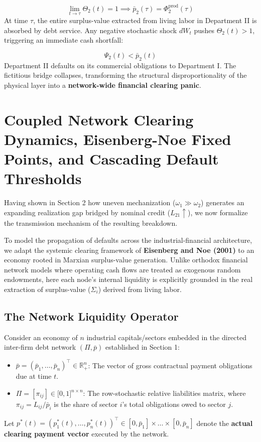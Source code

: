 \documentclass[11pt,letterpaper]{report}
\begin{document}
\[
\lim_{t \to \tau} \Theta_2(t) = 1 \implies \bar{p}_2(\tau) = \Phi_2^{\text{prod}}(\tau)
\]
At time $\tau$, the entire surplus-value extracted from living labor in Department II is absorbed by debt service. Any negative stochastic shock $d{W}_{t}$ pushes ${\Theta }_{2}(t)>1$, triggering an immediate cash shortfall:

\[
{\Psi }_{2}(t)<{\bar{p}}_{2}(t)
\]
Department II defaults on its commercial obligations to Department I. The fictitious bridge collapses, transforming the structural disproportionality of the physical layer into a \textbf{network-wide financial clearing panic}.

\section{Coupled Network Clearing Dynamics, Eisenberg-Noe Fixed Points, and Cascading Default Thresholds}
Having shown in Section 2 how uneven mechanization (${\omega }_{1}\gg {\omega }_{2}$) generates an expanding realization gap bridged by nominal credit (${L}_{21}\uparrow$), we now formalize the transmission mechanism of the resulting breakdown.

To model the propagation of defaults across the industrial-financial architecture, we adapt the systemic clearing framework of \textbf{Eisenberg and Noe (2001)} to an economy rooted in Marxian surplus-value generation. Unlike orthodox financial network models where operating cash flows are treated as exogenous random endowments, here each node's internal liquidity is explicitly grounded in the real extraction of surplus-value (${\Sigma }_{i}$) derived from living labor.

\subsection{The Network Liquidity Operator}
Consider an economy of $n$ industrial capitals/sectors embedded in the directed inter-firm debt network $(\Pi ,\bar{p})$ established in Section 1:

\begin{itemize}
\item $\bar{p} = (\bar{p}_1, \dots, \bar{p}_n)^\top \in \mathbb{R}_{+}^{n}$: The vector of gross contractual payment obligations due at time $t$.
\item $\Pi =[{\pi }_{ij}]\in [0,1{]}^{n\times n}$: The row-stochastic relative liabilities matrix, where ${\pi }_{ij}={L}_{ij}/{\bar{p}}_{i}$ is the share of sector $i$'s total obligations owed to sector $j$.
\end{itemize}
Let $p^*(t) = (p_1^*(t), \dots, p_n^*(t))^\top \in [0, \bar{p}_1] \times \dots \times [0, \bar{p}_n]$ denote the \textbf{actual clearing payment vector} executed by the network.
\end{document}
